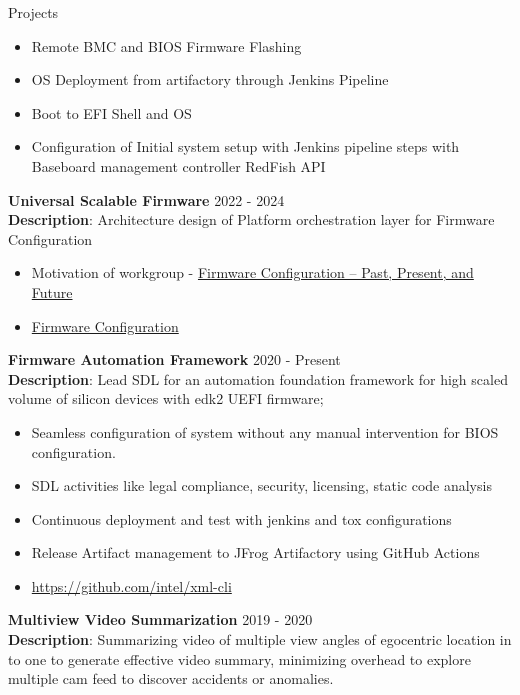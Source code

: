 \documentclass{resume} %
\begin{document}
\begin{rSection}{Projects}
\begin{itemize}
    \item Remote BMC and BIOS Firmware Flashing
    \item OS Deployment from artifactory through Jenkins Pipeline
    \item Boot to EFI Shell and OS
    \item Configuration of Initial system setup with Jenkins pipeline steps with Baseboard management controller RedFish API
\end{itemize}

\textbf{Universal Scalable Firmware} \hfill {2022 - 2024} \\
\textbf{Description}: Architecture design of Platform orchestration layer for Firmware Configuration

\begin{itemize}
    \item Motivation of workgroup - \href{https://uefi.org/sites/default/files/resources/Firmware%20Configuration%20%E2%80%93%20Past%2C%20Present%2C%20and%20Future_Zimmer.pdf}{Firmware Configuration – Past, Present, and Future}
    \item \href{https://universalscalablefirmware.github.io/documentation/7_yaml_boot_configuration.html}{Firmware Configuration}
\end{itemize}

\textbf{Firmware Automation Framework}  \hfill {2020 - Present} \\
\textbf{Description}: Lead SDL for an automation foundation framework for high scaled volume of silicon devices with edk2 UEFI firmware;

\begin{itemize}
    \item Seamless configuration of system without any manual intervention for BIOS configuration.
    \item SDL activities like legal compliance, security, licensing, static code analysis
    \item Continuous deployment and test with jenkins and tox configurations
    \item Release Artifact management to JFrog Artifactory using GitHub Actions
    \item \href{https://github.com/intel/xml-cli}{https://github.com/intel/xml-cli}
\end{itemize}

\textbf{Multiview Video Summarization} \hfill {2019 - 2020}\\
\textbf{Description}: Summarizing video of multiple view angles of egocentric location in to one to generate effective video summary, minimizing overhead to explore multiple cam feed to discover accidents or anomalies.


\end{rSection}
\end{document}
